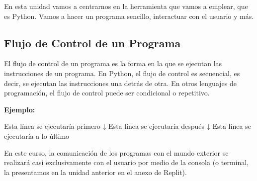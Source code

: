 \documentclass[
  letterpaper,
  DIV=11,
  numbers=noendperiod]{scrreprt}
\newenvironment{Shaded}{\begin{snugshade}}{\end{snugshade}}
\newcommand{\NormalTok}[1]{\textcolor[rgb]{0.00,0.23,0.31}{#1}}
\begin{document}
En esta unidad vamos a centrarnos en la herramienta que vamos a emplear,
que es Python. Vamos a hacer un programa sencillo, interactuar con el
usuario y más.

\subsection{Flujo de Control de un
Programa}\label{flujo-de-control-de-un-programa}

El flujo de control de un programa es la forma en la que se ejecutan las
instrucciones de un programa. En Python, el flujo de control es
secuencial, es decir, se ejecutan las instrucciones una detrás de otra.
En otros lenguajes de programación, el flujo de control puede ser
condicional o repetitivo.

\textbf{Ejemplo:}

\begin{Shaded}
\begin{Highlighting}[]
\NormalTok{Esta línea se ejecutaría primero        ↓}
\NormalTok{Esta línea se ejecutaría después        ↓}
\NormalTok{Esta línea se ejecutaría a lo último    }
\end{Highlighting}
\end{Shaded}

En este curso, la comunicación de los programas con el mundo exterior se
realizará casi exclusivamente con el usuario por medio de la consola (o
terminal, la presentamos en la unidad anterior en el anexo de Replit).
\end{document}

